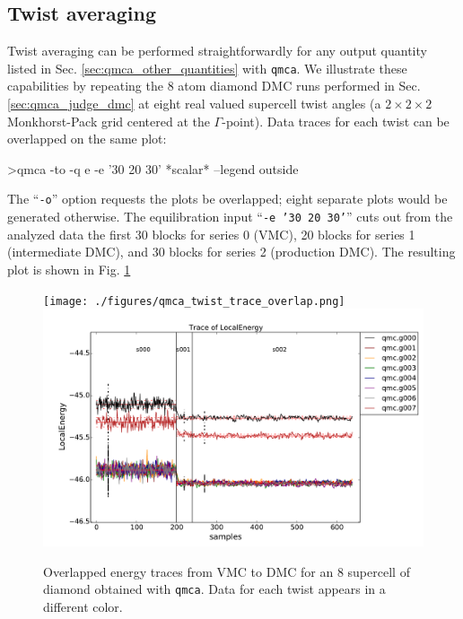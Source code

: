 \subsection{Twist averaging}
\label{sec:qmca_twist_average}
Twist averaging can be performed straightforwardly for any 
output quantity listed in Sec. \ref{sec:qmca_other_quantities} 
with \texttt{qmca}.  We illustrate these capabilities by 
repeating the 8 atom diamond DMC runs performed in Sec. 
\ref{sec:qmca_judge_dmc} at eight real valued supercell twist 
angles (a $2\times 2\times 2$ Monkhorst-Pack grid centered at 
the $\Gamma$-point).  Data traces for each twist can be overlapped 
on the same plot:
\begin{shade}
>qmca -to -q e -e '30 20 30' *scalar* --legend outside
\end{shade}
\noindent
The ``\texttt{-o}'' option requests the plots be overlapped; 
eight separate plots would be generated otherwise.  The 
equilibration input ``\texttt{-e '30 20 30'}'' cuts out from 
the analyzed data the first 30 blocks for series 0 (VMC), 
20 blocks for series 1 (intermediate DMC), and 30 blocks for 
series 2 (production DMC).  The resulting plot is shown in 
Fig. \ref{fig:qmca_twist_overlap}

\begin{figure}
\begin{center}
\ifdefined\HCode
\texttt{[image: ./figures/qmca\_twist\_trace\_overlap.png]}
\else
\includegraphics[trim = 0mm 0mm 0mm 0mm, clip,width=0.9\columnwidth]{./figures/qmca_twist_trace_overlap.pdf}
\fi
\end{center}
\caption{Overlapped energy traces from VMC to DMC for an 8 supercell of diamond obtained with \texttt{qmca}.  Data for each twist appears in a different color.}
\label{fig:qmca_twist_overlap}
\end{figure}

